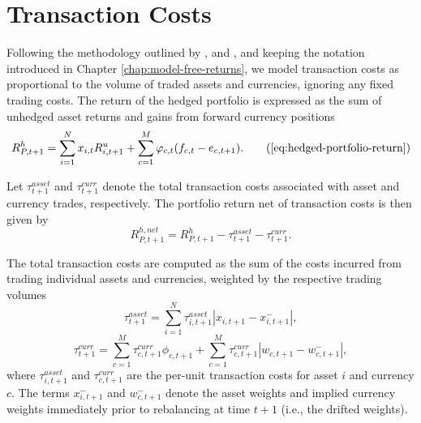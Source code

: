 \chapter{Transaction Costs} \label{app:transaction_costs}

Following the methodology outlined by \cite{SparseAndStableInternationalPortfolioOptimization},  \cite{SparseAndStableInternationalPortfolioOptimization} and \cite{Li2015}, and keeping the notation introduced in Chapter \ref{chap:model-free-returns}, we model transaction costs as proportional to the volume of traded assets and currencies, ignoring any fixed trading costs. The return of the hedged portfolio is expressed as the sum of unhedged asset returns and gains from forward currency positions
\begin{equation}
R^{h}_{P,t+1} = \sum_{i=1}^{N} x_{i,t} R^{u}_{i,t+1} + \sum_{c=1}^{M} \phi_{c,t} (f_{c,t} - e_{c,t+1}). \tag{\eqref{eq:hedged-portfolio-return}}
\end{equation}

Let $\tau^{asset}_{t+1}$ and $\tau^{curr}_{t+1}$ denote the total transaction costs associated with asset and currency trades, respectively. The portfolio return net of transaction costs is then given by
\begin{equation}
R^{h,net}_{P,t+1} = R^{h}_{P,t+1} - \tau^{asset}_{t+1} - \tau^{curr}_{t+1}.
\label{eq:hedged-portfolio-return-net}
\end{equation}
 
The total transaction costs are computed as the sum of the costs incurred from trading individual assets and currencies, weighted by the respective trading volumes
\begin{equation*}
\tau^{asset}_{t+1} = \sum_{i=1}^{N} \tau^{asset}_{i,t+1} |x_{i,t+1} - x^{-}_{i,t+1}|,
\end{equation*}
\begin{equation*}
\tau^{curr}_{t+1} = \sum_{c=1}^{M} \tau^{curr}_{c,t+1}  \phi_{c,t+1} + \sum_{c=1}^{M} \tau^{curr}_{c,t+1} |w_{c,t+1} - w^{-}_{c,t+1}|,
\end{equation*}
where $\tau^{asset}_{i,t+1}$ and $\tau^{curr}_{c,t+1}$ are the per-unit transaction costs for asset $i$ and currency $c$. The terms $x^{-}_{i,t+1}$ and $w^{-}_{c,t+1}$ denote the asset weights and implied currency weights immediately prior to rebalancing at time $t+1$ (i.e., the drifted weights).

